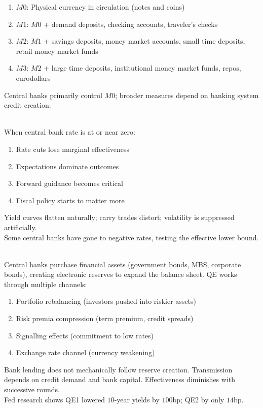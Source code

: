 \documentclass[a4paper,oneside,openany]{book}
\begin{document}
\begin{remark} 
\begin{enumerate}[label=\roman*.]
\setlength{\itemsep}{0pt}
\item $M0$: Physical currency in circulation (notes and coins)
\item $M1$: $M0$ + demand deposits, checking accounts, traveler's checks
\item $M2$: $M1$ + savings deposits, money market accounts, small time deposits, retail money market funds
\item $M3$: $M2$ + large time deposits, institutional money market funds, repos, eurodollars
\end{enumerate}
Central banks primarily control $M0$; broader measures depend on banking system credit creation.
\end{remark}

\begin{remark} \\
When central bank rate is at or near zero:
\begin{enumerate}[label=\roman*.]
\setlength{\itemsep}{0pt}
\item Rate cuts lose marginal effectiveness
\item Expectations dominate outcomes
\item Forward guidance becomes critical
\item Fiscal policy starts to matter more
\end{enumerate}
Yield curves flatten naturally; carry trades distort; volatility is suppressed artificially.\\
Some central banks have gone to negative rates, testing the effective lower bound.
\end{remark}

\begin{remark} \\
Central banks purchase financial assets (government bonds, MBS, corporate bonds), creating electronic reserves to expand the balance sheet. QE works through multiple channels:
\begin{enumerate}[label=\roman*.]
\setlength{\itemsep}{0pt}
\item Portfolio rebalancing (investors pushed into riskier assets)
\item Risk premia compression (term premium, credit spreads)
\item Signalling effects (commitment to low rates)
\item Exchange rate channel (currency weakening)
\end{enumerate}
Bank lending does not mechanically follow reserve creation. Transmission depends on credit demand and bank capital. Effectiveness diminishes with successive rounds.\\
Fed research shows QE1 lowered $10$-year yields by $100$bp; QE2 by only $14$bp.
\end{remark}
\end{document}
